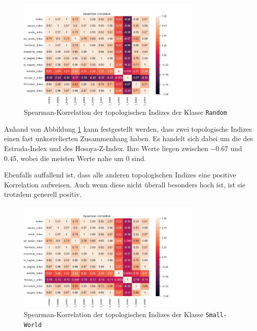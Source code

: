 \begin{figure}[H]
    \centering
    \includegraphics[width=0.8\textwidth]{images/30_results/random-correlation.png}
    \caption{Spearman-Korrelation der topologischen Indizes der Klasse \texttt{Random}}
    \label{fig:correlation-random}
\end{figure}

Anhand von Abbildung \ref{fig:correlation-random} kann festgestellt werden, dass zwei topologische Indizes einen fast unkorrelierten Zusammenhang haben. Es handelt sich dabei um die des Estrada-Index und des Hosoya-Z-Index. Ihre Werte liegen zwischen $ -0.67 $ und $ 0.45 $, wobei die meisten Werte nahe um $ 0 $ sind.

Ebenfalls auffallend ist, dass alle anderen topologischen Indizes eine positive Korrelation aufweisen. Auch wenn diese nicht überall besonders hoch ist, ist sie trotzdem generell positiv.

\begin{figure}[H]
    \centering
    \includegraphics[width=0.8\textwidth]{images/30_results/smallworld-correlation.png}
    \caption{Spearman-Korrelation der topologischen Indizes der Klasse \texttt{Small-World}}
    \label{fig:correlation-smallworld}
\end{figure}


